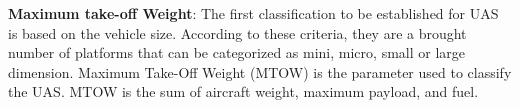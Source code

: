 \textbf{Maximum take-off Weight}: The first classification to be established for UAS is based on the vehicle size. According to these criteria, they are a brought number of platforms that can be categorized as mini, micro, small or large dimension. Maximum Take-Off Weight (MTOW) is the parameter used to classify the UAS. MTOW is the sum of aircraft weight, maximum payload, and fuel.\cite{ICAO}

